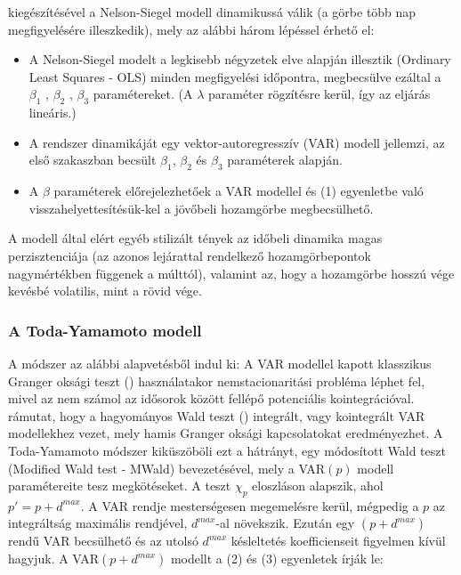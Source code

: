 \documentclass[12pt,bibliography=totoc]{article}
\begin{document}
\cite{diebold2006forecasting} kiegészítésével a Nelson-Siegel modell dinamikussá válik (a görbe több nap megfigyelésére illeszkedik), mely az alábbi három lépéssel érhető el:

\begin{itemize}
\item A Nelson-Siegel modelt a legkisebb négyzetek elve alapján illesztik (Ordinary Least Squares - OLS)  minden megfigyelési időpontra, megbecsülve ezáltal a $\beta_{1}$ ,  $\beta_{2}$ ,  $\beta_{3}$  paramétereket. (A $\lambda$ paraméter rögzítésre kerül, így az eljárás lineáris.)
\item A rendszer dinamikáját egy vektor-autoregresszív (VAR) modell jellemzi, az első szakaszban becsült  $\beta_{1}$,  $\beta_{2}$ és $\beta_{3}$ paraméterek alapján. 
\item A $\beta$ paraméterek előrejelezhetőek a VAR modellel és (1) egyenletbe való visszahelyettesítésük-kel a jövőbeli hozamgörbe megbecsülhető.
\end{itemize}

A \cite{diebold2006forecasting} modell által elért egyéb stilizált tények az időbeli dinamika magas perzisztenciája (az azonos lejárattal rendelkező hozamgörbepontok nagymértékben függenek a múlttól), valamint az, hogy a hozamgörbe hosszú vége kevésbé volatilis, mint a rövid vége.



\subsubsection{A Toda-Yamamoto modell}

A \cite{toda1995statistical} módszer az alábbi alapvetésből indul ki: A VAR modellel kapott klasszikus Granger oksági teszt (\cite{granger1969investigating}) használatakor nemstacionaritási probléma léphet fel, mivel az nem számol az idősorok között fellépő potenciális kointegrációval. \cite{toda1995statistical} rámutat, hogy a hagyományos Wald teszt (\cite{silvey1959lagrangian}) integrált, vagy kointegrált VAR modellekhez vezet, mely hamis Granger oksági kapcsolatokat eredményezhet. A Toda-Yamamoto módszer kiküszöböli ezt a hátrányt, egy módosított Wald teszt (Modified Wald test - MWald)
bevezetésével, mely a  VAR$(p)$ modell paramétereite tesz megkötéseket. A teszt $\chi_{p}$  eloszláson alapszik, ahol $p' = p + d^{max}$. A VAR rendje mesterségesen megemelésre kerül, mégpedig a $p$ az integráltság maximális rendjével, $d^{max}$-al növekszik. Ezután egy $(p + d^{max})$ rendű VAR becsülhető és az utolsó  $d^{max}$ késleltetés koefficienseit figyelmen kívül hagyjuk. A VAR$(p + d^{max})$  modellt a (2) és (3) egyenletek írják le:
\end{document}
